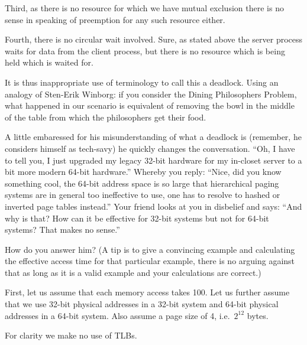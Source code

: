\documentclass[addpoints,svv]{miunexam}
\begin{document}
\begin{questions}
\begin{solution}
    Third, as there is no resource for which we have mutual exclusion there is 
    no sense in speaking of preemption for any such resource either.

    Fourth, there is no circular wait involved.
    Sure, as stated above the server process waits for data from the client 
    process, but there is no resource which is being held which is waited for.

    It is thus inappropriate use of terminology to call this a deadlock.
    Using an analogy of Sten-Erik Winborg: if you consider the Dining 
    Philosophers Problem, what happened in our scenario is equivalent of 
    removing the bowl in the middle of the table from which the philosophers 
    get their food.
  \end{solution}


  \question[3]\label{q:addrspace}
  A little embaressed for his misunderstanding of what a deadlock is (remember, 
  he considers himself as tech-savy) he quickly changes the conversation.
  ``Oh, I have to tell you, I just upgraded my legacy 32-bit hardware for my 
  in-closet server to a bit more modern 64-bit hardware.''
  Whereby you reply: ``Nice, did you know something cool, the 64-bit address 
  space is so large that hierarchical paging systems are in general too 
  ineffective to use, one has to resolve to hashed or inverted page tables 
  instead.''
  Your friend looks at you in disbelief and says: ``And why is that?
  How can it be effective for 32-bit systems but not for 64-bit systems?  That 
  makes no sense.''

  How do you answer him?
  (A tip is to give a convincing example and calculating the effective access 
  time for that particular example, there is no arguing against that as long as 
  it is a valid example and your calculations are correct.)

  \begin{solution}
    First, let us assume that each memory access takes 
    \unit{100}{\nano\second}.
    Let us further assume that we use 32-bit physical addresses in a 32-bit 
    system and 64-bit physical addresses in a 64-bit system.
    Also assume a page size of \unit{4}{\kibi\byte}, i.e.\ \(2^{12}\) bytes.

    For clarity we make no use of TLBs.


\end{solution}
\end{questions}
\end{document}
